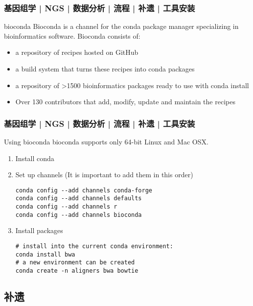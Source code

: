 \begin{frame}
  \frametitle{基因组学 | NGS | 数据分析 | 流程 | 补遗 | 工具安装}
  \begin{block}{\alert{bioconda}}
    Bioconda is a channel for the conda package manager specializing in bioinformatics software. Bioconda consists of:
    \begin{itemize}
      \item a repository of recipes hosted on GitHub
      \item a build system that turns these recipes into conda packages
      \item a repository of >1500 bioinformatics packages ready to use with conda install
      \item Over 130 contributors that add, modify, update and maintain the recipes
    \end{itemize}
  \end{block}
\end{frame}

\begin{frame}[fragile]
  \frametitle{基因组学 | NGS | 数据分析 | 流程 | 补遗 | 工具安装}
  \begin{block}{Using bioconda}
    bioconda supports only 64-bit Linux and Mac OSX.
    \begin{enumerate}
      \item Install conda
      \item Set up channels (It is important to add them in this order)
\vspace{-0.5em}
\begin{lstlisting}
conda config --add channels conda-forge
conda config --add channels defaults
conda config --add channels r
conda config --add channels bioconda
\end{lstlisting}
\vspace{-0.8em}
      \item Install packages
\vspace{-0.5em}
\begin{lstlisting}
# install into the current conda environment:
conda install bwa
# a new environment can be created
conda create -n aligners bwa bowtie
\end{lstlisting}
    \end{enumerate}
  \end{block}
\end{frame}

\subsection{补遗}

